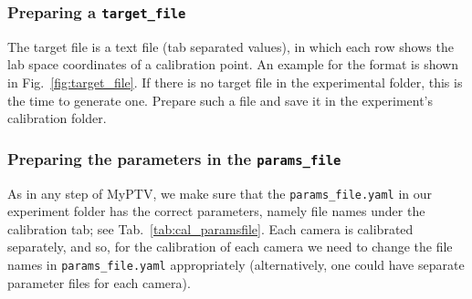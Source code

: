 \documentclass[10pt,a4paper]{article}
\begin{document}
%
%




\subsubsection{Preparing a \texttt{target\_file}}\label{sec:target_file}

The target file is a text file (tab separated values), in which each row shows the lab space coordinates of a calibration point.  An example for the format is shown in Fig.~\ref{fig:target_file}. If there is no target file in the experimental folder, this is the time to generate one. Prepare such a file and save it in the experiment's calibration folder.




\subsubsection{Preparing the parameters in the \texttt{params\_file}}

As in any step of MyPTV, we make sure that the \texttt{params\_file.yaml} in our experiment folder has the correct parameters, namely file names under the calibration tab; see Tab.~\ref{tab:cal_paramsfile}. Each camera is calibrated separately, and so, for the calibration of each camera we need to change the file names in \texttt{params\_file.yaml} appropriately (alternatively, one could have separate parameter files for each camera).  
\end{document}
